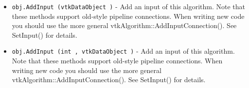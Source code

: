 \begin{itemize}
\item  \verb|obj.AddInput (vtkDataObject )| -  Add an input of this algorithm.  Note that these methods support
 old-style pipeline connections.  When writing new code you should
 use the more general vtkAlgorithm::AddInputConnection().  See
 SetInput() for details.

\item  \verb|obj.AddInput (int , vtkDataObject )| -  Add an input of this algorithm.  Note that these methods support
 old-style pipeline connections.  When writing new code you should
 use the more general vtkAlgorithm::AddInputConnection().  See
 SetInput() for details.

\end{itemize}
